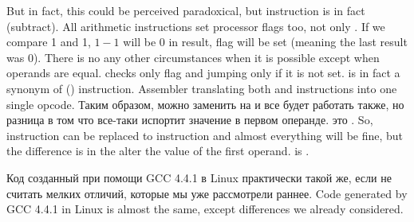 \label{CMPandSUB}
{But in fact, this could be perceived paradoxical, but \CMP instruction is in fact \SUB (subtract).}
{All arithmetic instructions set processor flags too, not only \CMP.}
{If we compare 1 and 1, $1-1$ will be $0$ in result, \ZF flag will be set (meaning the last result was $0$).}
{There is no any other circumstances when it is possible except when operands are equal.}
{\JNE checks only \ZF flag and jumping only if it is not set. 
\JNE is in fact a synonym of \JNZ () instruction.}
{Assembler translating both \JNE and \JNZ instructions into one single opcode.}
\IFRU
{Таким образом, можно \CMP заменить на \SUB и все будет работать также, но разница в том что \SUB 
все-таки испортит значение в первом операнде. \CMP это .}
{So, \CMP instruction can be replaced to \SUB instruction and almost everything will be fine,
but the difference is in 
the \SUB alter the value of the first operand.
\CMP is .}

\IFRU
{Код созданный при помощи GCC 4.4.1 в Linux практически такой же, если не считать мелких отличий, 
которые мы уже рассмотрели раннее.}
{Code generated by GCC 4.4.1 in Linux is almost the same, except differences we already considered.}


